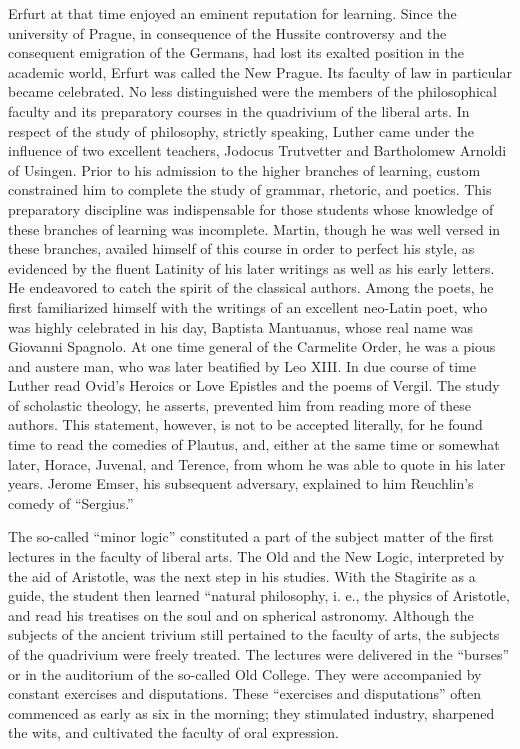 Erfurt at that time enjoyed an eminent reputation for learning.
Since the university of Prague, in consequence of the Hussite controversy and the consequent emigration of the Germans, had lost its
exalted position in the academic world, Erfurt was called the New
Prague. Its faculty of law in particular became celebrated. No less
distinguished were the members of the philosophical faculty and its
preparatory courses in the quadrivium of the liberal arts. In respect of
the study of philosophy, strictly speaking, Luther came under the influence of two excellent teachers, Jodocus Trutvetter and Bartholomew Arnoldi of Usingen. Prior to his admission to the higher
branches of learning, custom constrained him to complete the study
of grammar, rhetoric, and poetics. This preparatory discipline was indispensable for those students whose knowledge of these branches of
learning was incomplete. Martin, though he was well versed in these
branches, availed himself of this course in order to perfect his style,
as evidenced by the fluent Latinity of his later writings as well as his
early letters. He endeavored to catch the spirit of the classical authors.
Among the poets, he first familiarized himself with the writings of
an excellent neo-Latin poet, who was highly celebrated in his day,
Baptista Mantuanus, whose real name was Giovanni Spagnolo. At one
time general of the Carmelite Order, he was a pious and austere man,
who was later beatified by Leo XIII. In due course of time Luther
read Ovid’s Heroics or Love Epistles and the poems of Vergil. The
study of scholastic theology, he asserts, prevented him from reading
more of these authors. This statement, however, is not to be accepted
literally, for he found time to read the comedies of Plautus, and,
either at the same time or somewhat later, Horace, Juvenal, and Terence, from whom he was able to quote in his later years. Jerome Emser, his subsequent adversary, explained to him Reuchlin’s comedy of
“Sergius.”

The so-called “minor logic” constituted a part of the subject matter of the first lectures in the faculty of liberal arts. The Old
and the New Logic, interpreted by the aid of Aristotle, was the next
step in his studies. With the Stagirite as a guide, the student then
learned “natural philosophy, i. e., the physics of Aristotle, and read his
treatises on the soul and on spherical astronomy. Although the subjects of the ancient trivium still pertained to the faculty of arts, the
subjects of the quadrivium were freely treated. The lectures were delivered in the “burses” or in the auditorium of the so-called Old College. They were accompanied by constant exercises and disputations.
These “exercises and disputations” often commenced as early as six
in the morning; they stimulated industry, sharpened the wits, and
cultivated the faculty of oral expression.

